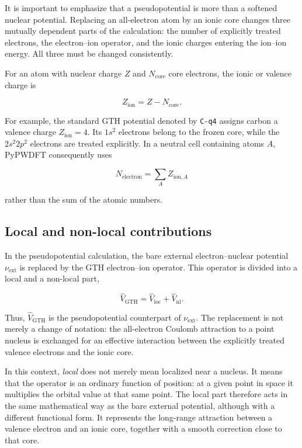 It is important to emphasize that a pseudopotential is more than a softened nuclear potential. Replacing an all-electron atom by an ionic core changes three mutually dependent parts of the calculation: the number of explicitly treated electrons, the electron--ion operator, and the ionic charges entering the ion--ion energy. All three must be changed consistently.

For an atom with nuclear charge $Z$ and $N_{\text{core}}$ core electrons, the ionic or valence charge is

\begin{equation}
    Z_{\text{ion}} = Z - N_{\text{core}}.
    \label{eq:gth-zion}
\end{equation}

For example, the standard GTH potential denoted by \texttt{C-q4} assigns carbon a valence charge $Z_{\text{ion}}=4$. Its $1s^{2}$ electrons belong to the frozen core, while the $2s^{2}2p^{2}$ electrons are treated explicitly. In a neutral cell containing atoms $A$, PyPWDFT consequently uses

\begin{equation}
    N_{\text{electron}} = \sum_{A} Z_{\text{ion},A}
    \label{eq:gth-nelec}
\end{equation}

rather than the sum of the atomic numbers.

%
%
%
\subsection{Local and non-local contributions}

In the pseudopotential calculation, the bare external electron--nuclear potential $\nu_{\text{ext}}$ is replaced by the GTH electron--ion operator. This operator is divided into a local and a non-local part,

\begin{equation}
    \hat{V}_{\text{GTH}}
    = \hat{V}_{\text{loc}} + \hat{V}_{\text{nl}}.
    \label{eq:gth-split}
\end{equation}

Thus, $\hat{V}_{\text{GTH}}$ is the pseudopotential counterpart of $\nu_{\text{ext}}$. The replacement is not merely a change of notation: the all-electron Coulomb attraction to a point nucleus is exchanged for an effective interaction between the explicitly treated valence electrons and the ionic core.

In this context, \textit{local} does not merely mean localized near a nucleus. It means that the operator is an ordinary function of position: at a given point in space it multiplies the orbital value at that same point. The local part therefore acts in the same mathematical way as the bare external potential, although with a different functional form. It represents the long-range attraction between a valence electron and an ionic core, together with a smooth correction close to that core.

